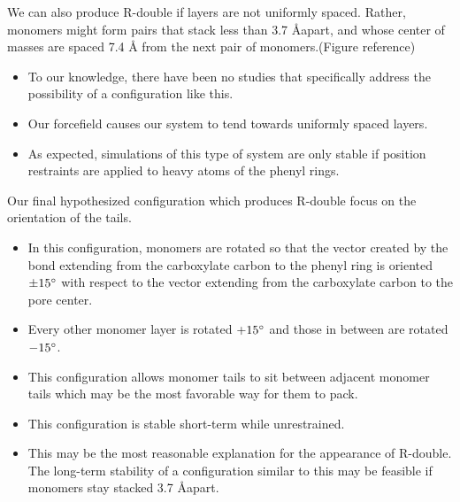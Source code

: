 \documentclass{article}
\begin{document}
  We can also produce R-double if layers are not uniformly spaced. Rather, monomers might form 
  pairs that stack less than 3.7 \AA apart, and whose center of masses are spaced 7.4 \AA 
  from the next pair of monomers.(Figure reference)
  \begin{itemize}
  		\item To our knowledge, there have been no studies that specifically address the 
  		possibility of a configuration like this. 
  		\item Our forcefield causes our system to tend towards uniformly spaced layers. 
  		\item As expected, simulations of this type of system are only stable if position
  		restraints are applied to heavy atoms of the phenyl rings.
  \end{itemize}
  
   Our final hypothesized configuration which produces R-double focus on the orientation of the
   tails. 
   \begin{itemize}
  		\item In this configuration, monomers are rotated so that the vector created by the  
  		bond extending from the carboxylate carbon to the phenyl ring is oriented $\pm 15 	
  		\degree$ with respect to the vector extending from the carboxylate carbon to the pore
  		center.
  		\item Every other monomer layer is rotated $+15 \degree$ and those in between are
  		rotated $-15 \degree$.
  		\item This configuration allows monomer tails to sit between adjacent monomer tails 
  		which may be the most favorable way for them to pack. 
  		\item This configuration is stable short-term while unrestrained.
  		\item This may be the most reasonable explanation for the appearance of R-double. The
  		long-term stability of a configuration similar to this may be feasible if monomers
  		stay stacked 3.7 \AA apart. 
  \end{itemize}
  
\end{document}
